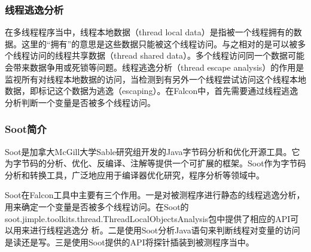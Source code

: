 \subsubsection{线程逃逸分析}
在多线程程序当中，线程本地数据（thread local data）是指被一个线程拥有的数据。这里的``拥有''的意思是这些数据只能被这个线程访问\cite{threadlocal}。与之相对的是可以被多个线程访问的线程共享数据（thread shared data）。多个线程访问同一个数据可能会带来数据争用或死锁等问题。线程逃逸分析（thread escape analysis）的作用是监视所有对线程本地数据的访问，当检测到有另外一个线程尝试访问这个线程本地数据，即标记这个数据为逃逸（escaping）\cite{threadescape}。在Falcon中，首先需要通过线程逃逸分析判断一个变量是否被多个线程访问。
\subsubsection{Soot简介}
Soot是加拿大McGill大学Sable研究组开发的Java字节码分析和优化开源工具。它为字节码的分析、优化、反编译、注解等提供一个可扩展的框架\cite{jnuthesis2}。Soot作为字节码分析和转换工具，广泛地应用于编译器优化研究，程序分析等领域中。\par
Soot在Falcon工具中主要有三个作用。一是对被测程序进行静态的线程逃逸分析，用来确定一个变量是否被多个线程访问。在Soot的soot.jimple.toolkits.thread.ThreadLocalObjectsAnalysis包中提供了相应的API可以用来进行线程逃逸分
析\cite{halpert2008static}。二是使用Soot分析Java语句来判断线程对变量的访问是读还是写。三是使用Soot提供的API将探针插装到被测程序当中。
